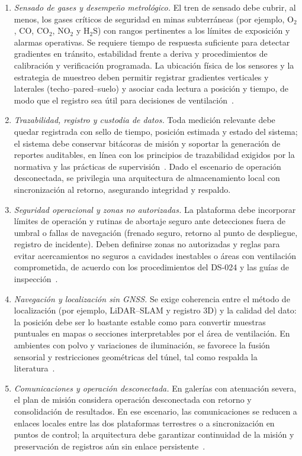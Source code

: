 \begin{enumerate}
\item \textit{Sensado de gases y desempeño metrológico.} El tren de sensado debe cubrir, al menos, los gases críticos de seguridad en minas subterráneas (por ejemplo, O$_2$, CO, CO$_2$, NO$_2$ y H$_2$S) con rangos pertinentes a los límites de exposición y alarmas operativas. Se requiere tiempo de respuesta suficiente para detectar gradientes en tránsito, estabilidad frente a deriva y procedimientos de calibración y verificación programada. La ubicación física de los sensores y la estrategia de muestreo deben permitir registrar gradientes verticales y laterales (techo--pared--suelo) y asociar cada lectura a posición y tiempo, de modo que el registro sea útil para decisiones de ventilación~\cite{OSINERGMIN_BoletinGSM_2020b,MINEM_DS024_2016}.
\item \textit{Trazabilidad, registro y custodia de datos.} Toda medición relevante debe quedar registrada con sello de tiempo, posición estimada y estado del sistema; el sistema debe conservar bitácoras de misión y soportar la generación de reportes auditables, en línea con los principios de trazabilidad exigidos por la normativa y las prácticas de supervisión~\cite{MINEM_DS024_2016,OSINERGMIN_BoletinGSM_2020}. Dado el escenario de operación desconectada, se privilegia una arquitectura de almacenamiento local con sincronización al retorno, asegurando integridad y respaldo.
\item \textit{Seguridad operacional y zonas no autorizadas.} La plataforma debe incorporar límites de operación y rutinas de abortaje seguro ante detecciones fuera de umbral o fallas de navegación (frenado seguro, retorno al punto de despliegue, registro de incidente). Deben definirse zonas no autorizadas y reglas para evitar acercamientos no seguros a cavidades inestables o áreas con ventilación comprometida, de acuerdo con los procedimientos del DS-024 y las guías de inspección~\cite{MINEM_DS024_2016,OSINERGMIN_BoletinGSM_2020b}.
\item \textit{Navegación y localización sin GNSS.} Se exige coherencia entre el método de localización (por ejemplo, LiDAR--SLAM y registro 3D) y la calidad del dato: la posición debe ser lo bastante estable como para convertir muestras puntuales en mapas o secciones interpretables por el área de ventilación. En ambientes con polvo y variaciones de iluminación, se favorece la fusión sensorial y restricciones geométricas del túnel, tal como respalda la literatura~\cite{KimChoi_2025_MineMapping}.
\item \textit{Comunicaciones y operación desconectada.} En galerías con atenuación severa, el plan de misión considera operación desconectada con retorno y consolidación de resultados. En ese escenario, las comunicaciones se reducen a enlaces locales entre las dos plataformas terrestres o a sincronización en puntos de control; la arquitectura debe garantizar continuidad de la misión y preservación de registros aún sin enlace persistente~\cite{OSINERGMIN_BoletinGSM_2020}.

\end{enumerate}
